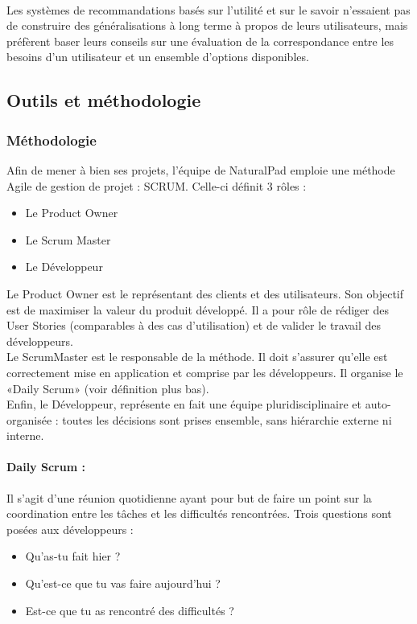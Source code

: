 	\paragraph{}
Les systèmes de recommandations basés sur l’utilité et sur le savoir n’essaient pas de construire des généralisations à long terme à propos de leurs utilisateurs, mais préfèrent baser leurs conseils sur une évaluation de la correspondance entre les besoins d’un utilisateur et un ensemble d’options disponibles.

\subsection{Outils et méthodologie}
	\subsubsection{Méthodologie}
Afin de mener à bien ses projets, l’équipe de NaturalPad emploie une méthode Agile de gestion de projet : SCRUM.
Celle-ci définit 3 rôles :
	\begin{itemize}
		\item Le Product Owner
		\item Le Scrum Master
		\item Le Développeur
	\end {itemize}
Le Product Owner est le représentant des clients et des utilisateurs. Son objectif est de maximiser la valeur du produit développé. Il a pour rôle de rédiger des User Stories (comparables à des cas d'utilisation) et de valider le travail des développeurs. 
\\Le ScrumMaster est le responsable de la méthode. Il doit s’assurer qu’elle est correctement mise en application et comprise par les développeurs. Il organise le «Daily Scrum» (voir définition plus bas).
\\Enfin, le Développeur, représente en fait une équipe pluridisciplinaire et auto-organisée : toutes les décisions sont prises ensemble, sans hiérarchie externe ni interne.
 
		\paragraph{Daily Scrum :}
Il s’agit d’une réunion quotidienne ayant pour but de faire un point sur la coordination entre les tâches et les difficultés rencontrées.  Trois questions sont posées aux développeurs : 
	\begin{itemize}
		\item Qu’as-tu fait hier ?
		\item Qu’est-ce que tu vas faire aujourd’hui ?
		\item Est-ce que tu as rencontré des difficultés ?
	\end {itemize}
	
